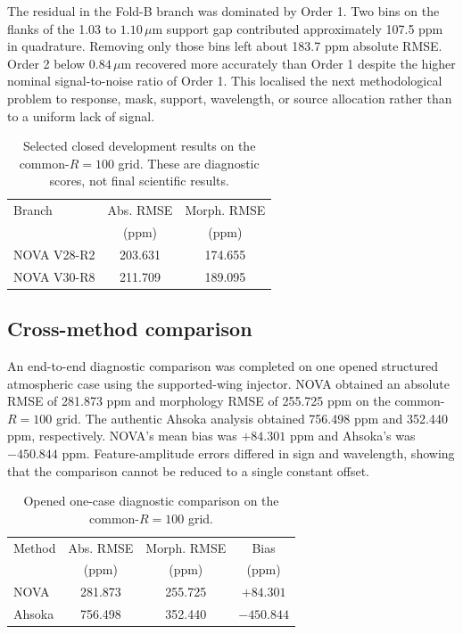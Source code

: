 The residual in the Fold-B branch was dominated by Order 1. Two bins on the
flanks of the 1.03 to $1.10\,\mu$m support gap contributed approximately
107.5 ppm in quadrature. Removing only those bins left about 183.7 ppm absolute
RMSE. Order 2 below $0.84\,\mu$m recovered more accurately than Order 1 despite
the higher nominal signal-to-noise ratio of Order 1. This localised the next
methodological problem to response, mask, support, wavelength, or source
allocation rather than to a uniform lack of signal.

\begin{table}[t]
 \centering
 \caption{Selected closed development results on the common-$R=100$ grid. These
 are diagnostic scores, not final scientific results.}
 \label{tab:development-results}
 \begin{tabular}{@{}lcc@{}}
  \toprule
  Branch & Abs. RMSE & Morph. RMSE \\
         & (ppm) & (ppm) \\
  \midrule
  NOVA V28-R2 & 203.631 & 174.655 \\
  NOVA V30-R8 & 211.709 & 189.095 \\
  \bottomrule
 \end{tabular}
\end{table}

\subsection{Cross-method comparison}

An end-to-end diagnostic comparison was completed on one opened structured
atmospheric case using the supported-wing injector. NOVA obtained an absolute
RMSE of 281.873 ppm and morphology RMSE of 255.725 ppm on the common-$R=100$
grid. The authentic Ahsoka analysis obtained 756.498 ppm and 352.440 ppm,
respectively. NOVA's mean bias was $+84.301$ ppm and Ahsoka's was
$-450.844$ ppm. Feature-amplitude errors differed in sign and wavelength,
showing that the comparison cannot be reduced to a single constant offset.

\begin{table}[t]
 \centering
 \small
 \setlength{\tabcolsep}{3pt}
 \caption{Opened one-case diagnostic comparison on the common-$R=100$ grid.}
 \label{tab:cross-method-results}
 \begin{tabular}{@{}lccc@{}}
  \toprule
  Method & Abs. RMSE & Morph. RMSE & Bias \\
         & (ppm) & (ppm) & (ppm) \\
  \midrule
  NOVA & 281.873 & 255.725 & $+84.301$ \\
  Ahsoka & 756.498 & 352.440 & $-450.844$ \\
  \bottomrule
 \end{tabular}
\end{table}

